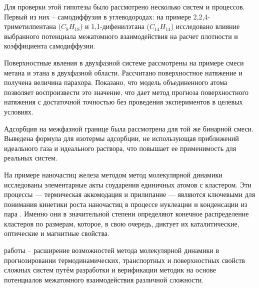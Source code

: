 Для проверки этой гипотезы было рассмотрено несколько систем и процессов. Первый из них \--- самодиффузия в углеводородах: на примере 2,2,4-триметилпентана ($C_8H_{18}$) и 1,1-дифенилэтана ($C_{14}H_{14}$) исследовано влияние выбранного потенциала межатомного взаимодействия на расчет плотности и коэффициента самодиффузии.

Поверхностные явления в двухфазной системе рассмотрены на примере смеси метана и этана в двухфазной области. Рассчитано поверхностное натяжение и получена величина парахора. Показано, что модель объединенного атома позволяет воспроизвести это значение, что дает метод прогноза поверхностного натяжения с достаточной точностью без проведения экспериментов в целевых условиях.

Адсорбция на межфазной границе была рассмотрена для той же бинарной смеси. Выведена формула для изотермы адсорбции, не использующая приближений идеального газа и идеального раствора, что повышает ее применимость для реальных систем.

На примере наночастиц железа методом метод молекулярной динамики исследованы элементарные акты соударения единичных атомов с кластером. Эти процессы — термическая аккомодация и прилипание — являются ключевыми для понимания кинетики роста наночастиц в процессе нуклеации и конденсации из пара . Именно они в значительной степени определяют конечное распределение кластеров по размерам, которое, в свою очередь, диктует их каталитические, оптические и магнитные свойства.


{\aim} работы \--- расширение возможностей метода молекулярной динамики в прогнозировании термодинамических, транспортных и поверхностных свойств сложных систем путём разработки и верификации методик на основе потенциалов межатомного взаимодействия различной сложности.

